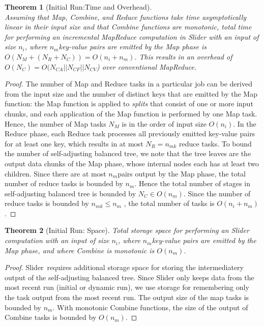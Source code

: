 \documentclass{article}
\newcommand{\projecttitle}{Slider\xspace}
\newtheorem{theorem}{Theorem}
\newcommand{\ninput}{\ensuremath{n_i}\xspace}
\newcommand{\nmap}{\ensuremath{N_M}\xspace}
\newcommand{\nred}{\ensuremath{N_R}\xspace}
\newcommand{\ncon}{\ensuremath{N_C}\xspace}
\newcommand{\nconAppend}{\ensuremath{N_{CA}}\xspace}
\newcommand{\nconFix}{\ensuremath{N_{CF}}\xspace}
\newcommand{\nconVariable}{\ensuremath{N_{CV}}\xspace}
\newcommand{\nkeysetmap}{\ensuremath{n_{mk}}}
\newcommand{\nkeyvaluemap}{\ensuremath{n_{m}}}
\begin{document}
\begin{theorem}[Initial Run:Time and Overhead]
\label{thm:time-initial}
\label{thm:time-overhead}
~\\
Assuming that Map, Combine, and Reduce functions take time
asymptotically linear in their input size and that Combine functions
are monotonic, total time for performing an incremental MapReduce
computation in \projecttitle with an input of size \ninput, where
\nkeyvaluemap key-value pairs are emitted by the Map phase is
$O(\nmap + (\nred + \ncon)) = O(\ninput + \nkeyvaluemap)$. This
results in an overhead of $O(\ncon) = O(\nconAppend || \nconFix ||
\nconVariable$) over conventional MapReduce.
\end{theorem}
\begin{proof}
The number of Map and Reduce tasks in a particular job can be derived
from the input size and the number of distinct keys that are emitted
by the Map function: the Map function is applied to \emph{splits} that
consist of one or more input chunks, and each application of the Map
function is performed by one Map task. Hence, the number of Map tasks
\nmap is in the order of input size $O(\ninput)$.  In the Reduce
phase, each Reduce task processes all previously emitted key-value
pairs for at least one key, which results in at most $\nred =
\nkeysetmap$ reduce tasks.  To bound the number of self-adjusting balanced tree,
we note that the tree leaves are the
output data chunks of the Map phase, whose internal nodes each has at
least two children. Since there are at most \nkeyvaluemap pairs output
by the Map phase, the total number of reduce tasks is bounded by
\nkeyvaluemap.  Hence the total number of stages in self-adjusting balanced
tree is bounded by $\ncon \in O(\nkeyvaluemap)$.  Since the number of reduce
tasks is bounded by $\nkeysetmap \le \nkeyvaluemap$ , the total number of tasks
is $O(\ninput + \nkeyvaluemap)$.  
\end{proof}


\begin{theorem}[Initial Run: Space]
\label{thm:space-initial}
Total storage space for performing an \projecttitle computation with
an input of size \ninput, where \nkeyvaluemap key-value pairs are
emitted by the Map phase, and where Combine is monotonic is $O(
\nkeyvaluemap)$.
\end{theorem}
\begin{proof}
\projecttitle~requires additional storage space for storing the intermediatery
output of the self-adjusting balanced tree.  Since \projecttitle only keeps data
from the most
recent run (initial or dynamic run), we use storage for
remembering only the task output from the most recent run.  The output size
of the map tasks is bounded by \nkeyvaluemap.  With monotonic Combine
functions, the size of the output of Combine tasks is bounded by
$O(\nkeyvaluemap)$.
\end{proof}
\end{document}

